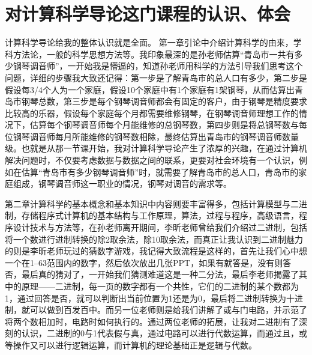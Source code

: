 \documentclass{article}
\begin{document}
\section{对计算科学导论这门课程的认识、体会}
计算科学导论给我的整体认识就是全面。
第一章引论中介绍计算科学的由来，学科方法论，一般的科学思想方法等。我印象最深的是孙老师估算“青岛市一共有多少钢琴调音师”，一开始我是懵逼的，知道孙老师用科学的方法引导我们思考这个问题，详细的步骤我大致还记得：第一步是了解青岛市的总人口有多少，第二步是假设每3/4个人为一个家庭，假设10个家庭中有1个家庭有1架钢琴，从而估算出青岛市钢琴总数，第三步是每个钢琴调音师都会有固定的客户，由于钢琴是精度要求比较高的乐器，假设每个家庭每个月都需要维修钢琴，在钢琴调音师理想工作的情况下，估算每个钢琴调音师每个月能维修的总钢琴数，第四步则是将总钢琴数与每位钢琴调音师每月所能维修的钢琴数相除，最终估算出青岛市的钢琴调音师数量级。也就是从那一节课开始，我对计算科学导论产生了浓厚的兴趣，在通过计算机解决问题时，不仅要考虑数据与数据之间的联系，更要对社会环境有一个认识，例如在估算“青岛市有多少钢琴调音师”时，就需要了解青岛市的总人口，青岛市的家庭组成，钢琴调音师这一职业的情况，钢琴对调音的需求等。\par
第二章计算科学的基本概念和基本知识中内容则要丰富得多，包括计算模型与二进制，存储程序式计算机的基本结构与工作原理，算法，过程与程序，高级语言，程序设计技术与方法等，在孙老师离开期间，李昕老师曾给我们介绍过二进制，包括将一个数进行进制转换的除2取余法，除10取余法，而真正让我认识到二进制魅力的则是李昕老师玩过的猜数字游戏，我记得大致流程是这样的，首先让我们心中想一个在1--63范围内的数字，然后依次放出几张PPT，如果有就答是，没有则答否，最后真的猜对了，一开始我们猜测难道这是一种二分法，最后李老师揭露了其中的原理——二进制，每一页的数字都有一个共性，它们的二进制的某个数都为1，通过回答是否，就可以判断出当前位置为1还是为0，最后将二进制转换为十进制，就可以做到百发百中。而另一位老师则是给我们讲解了或与门电路，并示范了将两个数相加时，电路时如何执行的。通过两位老师的拓展，让我对二进制有了深刻的认识，二进制的0与1代表假与真，通过电路可以进行代数运算，而通过且，或等操作又可以进行逻辑运算，而计算机的理论基础正是逻辑与代数。\par
\end{document}
